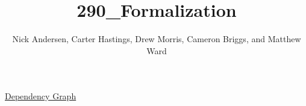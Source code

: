 \documentclass{report}
\title{290_Formalization}
\author{Nick Andersen, Carter Hastings, Drew Morris, Cameron Briggs, and Matthew Ward}
\begin{document}
\maketitle

\begin{center}
\href{https://dozenalist.github.io/Partitions-mod-p/dep_graph_document.html}{\large{Dependency Graph}}
\end{center}


\end{document}
